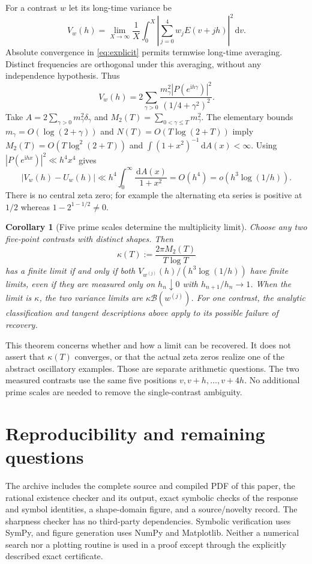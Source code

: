 \documentclass[11pt]{article}
\newtheorem{corollary}[theorem]{Corollary}
\theoremstyle{definition}\newtheorem{definition}[theorem]{Definition}
\theoremstyle{remark}\newtheorem{remark}[theorem]{Remark}
\newcommand{\dd}{\,\mathrm d}\newcommand{\ii}{\mathrm i}
\newcommand{\B}{\mathcal B}
\newcommand{\tauh}{h^3\log(1/h)}
\begin{document}
For a contrast $w$ let its long-time variance be
\begin{equation}\label{eq:primevariance}
 V_w(h)=\lim_{X\to\infty}\frac1X\int_0^X
 \left|\sum_{j=0}^4w_j E(v+jh)\right|^2\dd v.
\end{equation}
Absolute convergence in \eqref{eq:explicit} permits termwise long-time
averaging. Distinct frequencies are orthogonal under this averaging,
without any independence hypothesis. Thus
\begin{equation}\label{eq:spectralvariance}
 V_w(h)=2\sum_{\gamma>0}
 \frac{m_\gamma^2|P(e^{\ii h\gamma})|^2}{(1/4+\gamma^2)^2}.
\end{equation}
Take $A=2\sum_{\gamma>0}m_\gamma^2\delta_\gamma$ and
$M_2(T)=\sum_{0<\gamma\le T}m_\gamma^2$.
The elementary bounds $m_\gamma=O(\log(2+\gamma))$ and
$N(T)=O(T\log(2+T))$ imply $M_2(T)=O(T\log^2(2+T))$ and
$\int(1+x^2)^{-1}\dd A(x)<\infty$.
Using $|P(e^{\ii hx})|^2\ll h^4x^4$ gives
\[
 |V_w(h)-U_w(h)|
 \ll h^4\int_0^\infty\frac{\dd A(x)}{1+x^2}=O(h^4)
 =o(\tauh).
\]
There is no central zeta zero; for example the alternating eta series
is positive at $1/2$ whereas $1-2^{1-1/2}\ne0$.

\begin{corollary}[Five prime scales determine the multiplicity limit]\label{cor:zeta}
Choose any two five-point contrasts with distinct shapes. Then
\[
 \kappa(T):=\frac{2\pi M_2(T)}{T\log T}
\]
has a finite limit if and only if both $V_{w^{(j)}}(h)/(\tauh)$ have
finite limits, even if they are measured only on $h_n\downarrow0$ with
$h_{n+1}/h_n\to1$. When the limit is $\kappa$, the two variance limits
are $\kappa\B(w^{(j)})$. For one contrast, the analytic classification
and tangent descriptions above apply to its possible failure of recovery.
\end{corollary}

This theorem concerns whether and how a limit can be recovered. It does not
assert that $\kappa(T)$ converges, or that the actual zeta zeros realize one
of the abstract oscillatory examples. Those are separate arithmetic questions.
The two measured contrasts use the same five positions $v,v+h,\ldots,v+4h$.
No additional prime scales are needed to remove the single-contrast ambiguity.

\section{Reproducibility and remaining questions}

The archive includes the complete source and compiled PDF of this paper,
the rational existence checker and its output, exact symbolic checks of the
response and symbol identities, a shape-domain figure, and a source/novelty
record. The sharpness checker has no third-party dependencies. Symbolic
verification uses SymPy, and figure generation uses NumPy and Matplotlib.
Neither a numerical search nor a plotting routine is used in a proof except
through the explicitly described exact certificate.
\end{document}
